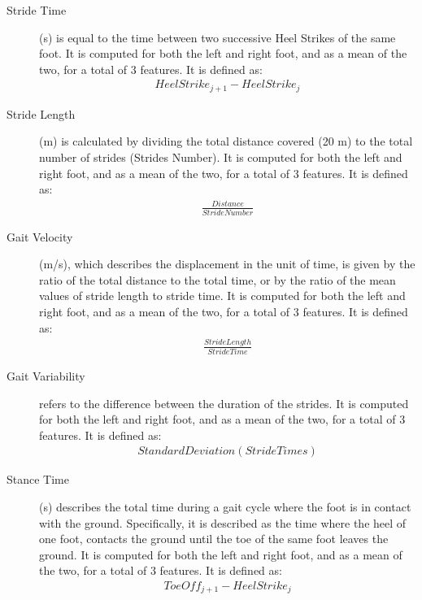 \begin{description}
\item[Stride Time] 
(s) is equal to the time between two successive Heel Strikes of the same foot. It is computed for both the left and right foot, and as a mean of the two, for a total of 3 features. It is defined as:
\begin{equation}
\begin{aligned}
HeelStrike_{j+1} - HeelStrike_{j}
\end{aligned}
\end{equation}

\item[Stride Length] 
 (m) is calculated by dividing the total distance covered (20 m) to the total number of strides (Strides Number). It is computed for both the left and right foot, and as a mean of the two, for a total of 3 features. It is defined as:
\begin{equation}
\begin{aligned}
\frac{Distance}{Stride Number}
\end{aligned}
\end{equation}

 
\item[Gait Velocity] 
 (m/s), which describes the displacement in the unit of time, is given by the ratio of the total distance to the total time, or by the ratio of the mean values of stride length to stride time. It is computed for both the left and right foot, and as a mean of the two, for a total of 3 features. It is defined as:
\begin{equation}
\begin{aligned}
\frac{Stride Length}{Stride Time}
\end{aligned}
\end{equation}


\item[Gait Variability] 
 refers to the difference between the duration of the strides. It is computed for both the left and right foot, and as a mean of the two, for a total of 3 features. It is defined as:
\begin{equation}
\begin{aligned}
Standard Deviation(Stride Times)
\end{aligned}
\end{equation}

 \item[Stance Time] 
 (s) describes the total time during a gait cycle where the foot is in contact with the ground. 
Specifically, it is described as the time where the heel of one foot, contacts the ground until the toe of the same foot 
leaves the ground. It is computed for both the left and right foot, and as a mean of the two, for a total of 3 features. It is defined as:
\begin{equation}
\begin{aligned}
Toe Off_{j+1}-Heel Strike_{j}
\end{aligned}
\end{equation}


\end{description}
